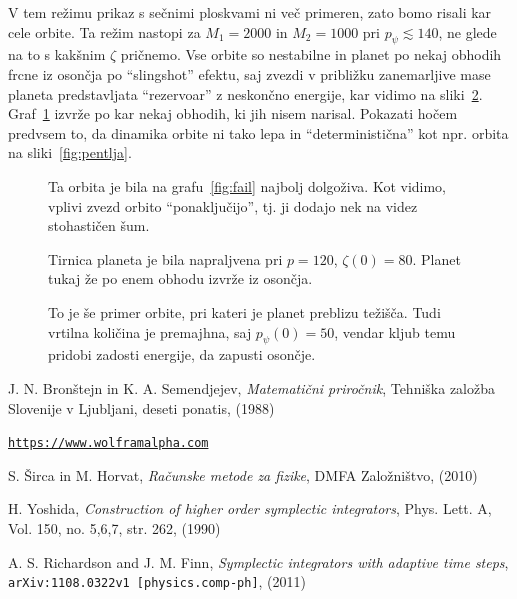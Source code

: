 \documentclass[12pt, a4paper]{article}
\begin{document}
V tem re\v zimu prikaz s se\v cnimi ploskvami ni ve\v c primeren, zato bomo risali kar cele orbite. Ta
re\v zim nastopi za $M_1 = 2000$ in $M_2 = 1000$ pri $p_\psi \lesssim 140$, ne glede na to s kak\v snim
$\zeta$ pri\v cnemo. Vse orbite so nestabilne in planet po nekaj obhodih frcne iz oson\v cja po
"`slingshot"' efektu, saj zvezdi v pribli\v zku zanemarljive mase planeta predstavljata "`rezervoar"'
z neskon\v cno energije, kar vidimo na sliki~\ref{fig:unstable2}. Graf~\ref{fig:unstable} izvr\v ze po
kar nekaj obhodih, ki jih nisem narisal. Pokazati ho\v cem predvsem to, da dinamika orbite ni tako lepa
in "`deterministi\v cna"' kot npr. orbita na sliki~\ref{fig:pentlja}.

\begin{figure}[H]\centering
	
	\caption{Ta orbita je bila na grafu~\ref{fig:fail} najbolj dolgo\v ziva. Kot vidimo, vplivi zvezd orbito
		"`ponaklju\v cijo"', tj. ji dodajo nek na videz stohasti\v cen \v sum.}
	\label{fig:unstable}
\end{figure}

\begin{figure}[H]\centering
	
	\caption{Tirnica planeta je bila napraljvena pri $p = 120$, $\zeta(0) = 80$. Planet tukaj \v ze po enem
		obhodu izvr\v ze iz oson\v cja.}
	\label{fig:unstable2}
\end{figure}

\begin{figure}[H]\centering
	
	\caption{To je \v se primer orbite, pri kateri je planet preblizu te\v zi\v s\v ca. Tudi vrtilna koli\v cina
		je premajhna, saj $p_\psi (0) = 50$, vendar kljub temu pridobi zadosti energije, da zapusti oson\v cje.}
	\label{fig:unstable3}
\end{figure}

\begin{thebibliography}{9}
		J. N. Bron\v stejn in K. A. Semendjejev,
		{\em Matemati\v cni priro\v cnik},
		Tehni\v ska zalo\v zba Slovenije v Ljubljani,
		deseti ponatis,
		(1988)

		\href{https://www.wolframalpha.com/input/?i=series\%20representations\%20incomplete\%20elliptic\%20integrals\&lk=2}
			{{\tt https://www.wolframalpha.com}}

        S. \v Sirca in M. Horvat,
        {\em Ra\v cunske metode za fizike},
        DMFA Zalo\v zni\v stvo,
        (2010)

        H. Yoshida,
        \emph{Construction of higher order symplectic integrators},
        Phys. Lett. A,
        Vol. 150, no. 5,6,7, str. 262,
        (1990)

        A. S. Richardson and J. M. Finn,
        \emph{Symplectic integrators with adaptive time steps},
        {\tt arXiv:1108.0322v1 [physics.comp-ph]},
        (2011)
\end{thebibliography}
\end{document}
